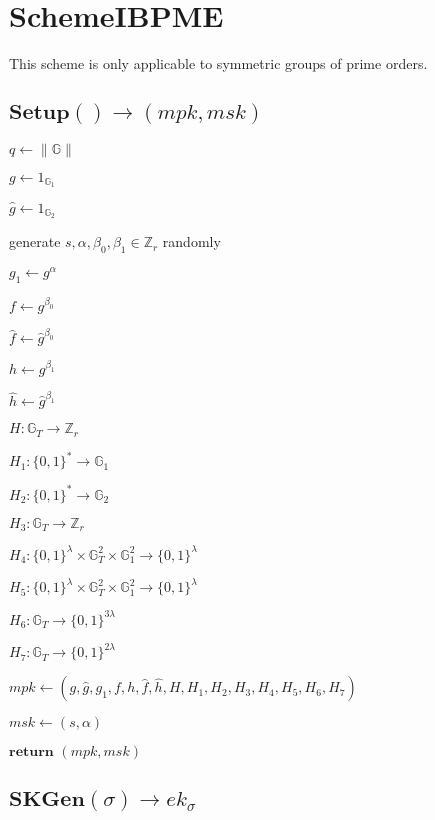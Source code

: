 \documentclass[a4paper]{article}
\begin{document}
\section{SchemeIBPME}

This scheme is only applicable to symmetric groups of prime orders. 

\subsection{$\textbf{Setup}() \rightarrow (\textit{mpk}, \textit{msk})$}

$q \gets \|\mathbb{G}\|$

$g \gets 1_{\mathbb{G}_1}$

$\hat{g} \gets 1_{\mathbb{G}_2}$

generate $s, \alpha, \beta_0, \beta_1 \in \mathbb{Z}_r$ randomly

$g_1 \gets g^\alpha$

$f \gets g^{\beta_0}$

$\hat{f} \gets \hat{g}^{\beta_0}$

$h \gets g^{\beta_1}$

$\hat{h} \gets \hat{g}^{\beta_1}$

$H: \mathbb{G}_T \rightarrow \mathbb{Z}_r$

$H_1: \{0, 1\}^* \rightarrow \mathbb{G}_1$

$H_2: \{0, 1\}^* \rightarrow \mathbb{G}_2$

$H_3: \mathbb{G}_T \rightarrow \mathbb{Z}_r$

$H_4: \{0, 1\}^\lambda \times \mathbb{G}_T^2 \times \mathbb{G}_1^2 \rightarrow \{0, 1\}^\lambda$

$H_5: \{0, 1\}^\lambda \times \mathbb{G}_T^2 \times \mathbb{G}_1^2 \rightarrow \{0, 1\}^\lambda$

$H_6: \mathbb{G}_T \rightarrow \{0, 1\}^{3\lambda}$

$H_7: \mathbb{G}_T \rightarrow \{0, 1\}^{2\lambda}$

$ \textit{mpk} \gets (g, \hat{g}, g_1, f, h, \hat{f}, \hat{h}, H, H_1, H_2, H_3, H_4, H_5, H_6, H_7)$

$\textit{msk} \gets (s, \alpha)$

$\textbf{return }(\textit{mpk}, \textit{msk})$

\subsection{$\textbf{SKGen}(\sigma) \rightarrow \textit{ek}_\sigma$}
\end{document}

